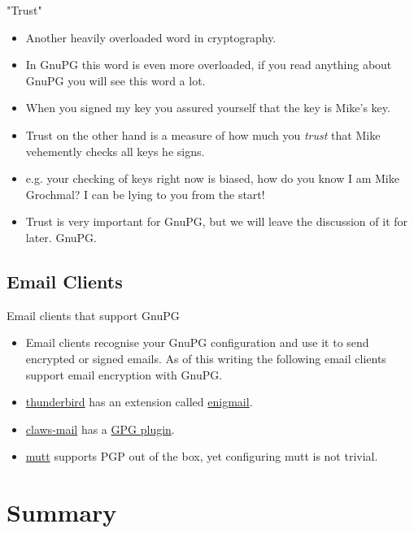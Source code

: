 \documentclass[hyperref={colorlinks=true}]{beamer}
\begin{document}
\begin{frame}{"Trust"}
  \begin{itemize}
    \item Another heavily overloaded word in cryptography.
    \item In GnuPG this word is even more overloaded, if you read anything
about GnuPG you will see this word a lot.
    \item When you signed my key you assured yourself that the key is Mike's
key.
    \item Trust on the other hand is a measure of how much you \emph{trust}
that Mike vehemently checks all keys he signs.
    \item e.g. your checking of keys right now is biased, how do you know I am
Mike Grochmal?  I can be lying to you from the start!
    \item Trust is very important for GnuPG, but we will leave the discussion
of it for later.
GnuPG.
  \end{itemize}
\end{frame}

\subsection{Email Clients}
\begin{frame}{Email clients that support GnuPG}
  \begin{itemize}
    \item Email clients recognise your GnuPG configuration and use it to send
encrypted or signed emails.  As of this writing the following email clients
support email encryption with GnuPG.
    \item \href{https://www.mozilla.org/en-US/thunderbird/}{thunderbird} has an
extension called \href{https://www.enigmail.net}{enigmail}.
    \item \href{http://www.claws-mail.org/}{claws-mail} has a
\href{http://www.claws-mail.org/plugin.php?plugin=gpg}{GPG plugin}.
    \item \href{http://www.mutt.org/}{mutt} supports PGP out of the box, yet
configuring mutt is not trivial.
  \end{itemize}
\end{frame}

\section{Summary}
\end{document}
